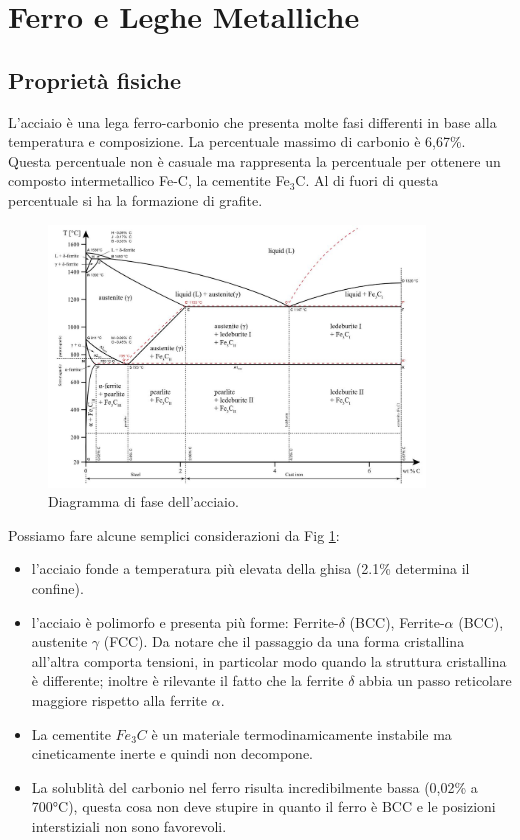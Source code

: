 \newpage

\section{Ferro e Leghe Metalliche}

\subsection{Proprietà fisiche}

L'acciaio è una lega ferro-carbonio che presenta molte fasi differenti in base alla temperatura e composizione. La percentuale massimo di carbonio è 6,67\%. Questa percentuale non è casuale ma rappresenta la percentuale per ottenere un composto intermetallico Fe-C, la cementite Fe$_3$C. Al di fuori di questa percentuale si ha la formazione di grafite.
\begin{figure}[h]
    \centering
    \includegraphics[width=10cm]{acciaio e transizioni di fase/Fe_phase_diagram.jpg}
    \caption{Diagramma di fase dell'acciaio.}
    \label{Steel-PhDia}
\end{figure}
Possiamo fare alcune semplici considerazioni da Fig \ref{Steel-PhDia}:
\begin{itemize}
    \item l'acciaio fonde a temperatura più elevata della ghisa (2.1\% determina il confine).
    \item l'acciaio è polimorfo e presenta più forme: Ferrite-$\delta$ (BCC), Ferrite-$\alpha$ (BCC), austenite $\gamma$ (FCC). Da notare che il passaggio da una forma cristallina all'altra comporta tensioni, in particolar modo quando la struttura cristallina è differente; inoltre è rilevante il fatto che la ferrite $\delta$ abbia un passo reticolare maggiore rispetto alla ferrite $\alpha$.
    \item La cementite $Fe_3C$ è un materiale termodinamicamente instabile ma cineticamente inerte e quindi non decompone.
    \item La solublità del carbonio nel ferro risulta incredibilmente bassa (0,02\% a 700°C), questa cosa non deve stupire in quanto il ferro è BCC e le posizioni interstiziali non sono favorevoli.      
\end{itemize}
